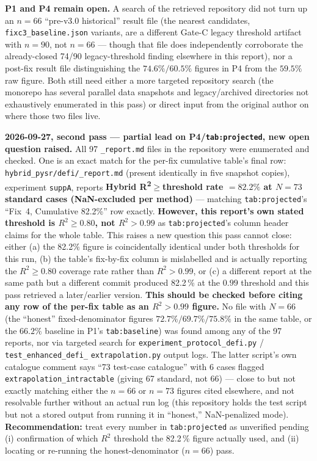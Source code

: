 \documentclass[11pt]{article}
\begin{document}
\textbf{P1 and P4 remain open.} A search of the retrieved repository did
not turn up an $n=66$ ``pre-v3.0 historical'' result file (the nearest
candidates, \texttt{fixc3\_baseline.json} variants, are a different Gate-C
legacy threshold artifact with $n=90$, not $n=66$ --- though that file
does independently corroborate the already-closed 74/90 legacy-threshold
finding elsewhere in this report), nor a post-fix result file distinguishing
the $74.6\%/60.5\%$ figures in P4 from the $59.5\%$ raw figure. Both
still need either a more targeted repository search (the monorepo has
several parallel data snapshots and legacy/archived directories not
exhaustively enumerated in this pass) or direct input from the original
author on where those two files live.

\textbf{2026-09-27, second pass — partial lead on P4/\texttt{tab:projected},
new open question raised.} All 97 \texttt{\_report.md} files in the
repository were enumerated and checked. One is an exact match for the
per-fix cumulative table's final row: \texttt{hybrid\_pysr/defi/\_report.md}
(present identically in five snapshot copies), experiment \texttt{suppA},
reports \textbf{Hybrid R\textsuperscript{2}$\geq$threshold rate
$=82.2\%$ at $N{=}73$ standard cases (NaN-excluded per method)} ---
matching \texttt{tab:projected}'s ``Fix~4, Cumulative 82.2\%'' row exactly.
\textbf{However, this report's own stated threshold is
$R^2\geq0.80$, not $R^2>0.99$} as \texttt{tab:projected}'s column header
claims for the whole table. This raises a new question this pass cannot
close: either (a) the 82.2\% figure is coincidentally identical under both
thresholds for this run, (b) the table's fix-by-fix column is mislabelled
and is actually reporting the $R^2\geq0.80$ coverage rate rather than
$R^2>0.99$, or (c) a different report at the same path but a different
commit produced 82.2\,\% at the $0.99$ threshold and this pass retrieved
a later/earlier version. \textbf{This should be checked before citing any
row of the per-fix table as an $R^2>0.99$ figure.} No file with
$N{=}66$ (the ``honest'' fixed-denominator figures $72.7\%/69.7\%/75.8\%$
in the same table, or the $66.2\%$ baseline in P1's \texttt{tab:baseline})
was found among any of the 97 reports, nor via targeted search for
\texttt{experiment\_protocol\_defi.py} / \texttt{test\_enhanced\_defi\_}
\texttt{extrapolation.py} output logs. The latter script's own catalogue
comment says ``73 test-case catalogue'' with 6 cases flagged
\texttt{extrapolation\_intractable} (giving 67 standard, not 66) ---
close to but not exactly matching either the $n{=}66$ or $n{=}73$ figures
cited elsewhere, and not resolvable further without an actual run log
(this repository holds the test script but not a stored output from
running it in ``honest,'' NaN-penalized mode). \textbf{Recommendation:}
treat every number in \texttt{tab:projected} as unverified pending (i)
confirmation of which $R^2$ threshold the 82.2\,\% figure actually used,
and (ii) locating or re-running the honest-denominator ($n=66$) pass.
\end{document}
